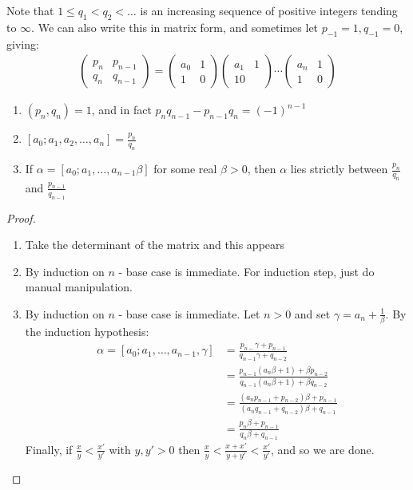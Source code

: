\documentclass[10pt,a4paper]{article}
\begin{document}
Note that $1 \leq q_1 < q_2 < \ldots$ is an increasing sequence of positive integers tending to $\infty$. We can also write this in matrix form, and sometimes let $p_{-1} = 1, q_{-1} = 0$, giving:
\begin{align*}
\begin{pmatrix}
p_n & p_{n-1} \\ q_n & q_{n-1}
\end{pmatrix} = \begin{pmatrix}
a_0 & 1 \\ 1 & 0
\end{pmatrix}\begin{pmatrix}
a_1 & 1 \\ 1  0
\end{pmatrix}\cdots\begin{pmatrix}
a_n & 1 \\ 1 & 0
\end{pmatrix}
\end{align*}
\begin{proposition}
\item
\begin{enumerate}
\item $(p_n, q_n) = 1$, and in fact $p_nq_{n-1} - p_{n-1}q_n = (-1)^{n-1}$
\item $[a_0;a_1, a_2, \ldots, a_n] = \frac{p_n}{q_n}$
\item If $\alpha = [a_0;a_1,\ldots,a_{n-1}\beta]$ for some real $\beta > 0$, then $\alpha$ lies strictly between $\frac{p_n}{q_n}$ and $\frac{p_{n-1}}{q_{n-1}}$
\end{enumerate}
\end{proposition}
\begin{proof}
\item
\begin{enumerate}
\item Take the determinant of the matrix and this appears
\item By induction on $n$ - base case is immediate. For induction step, just do manual manipulation.
\item By induction on $n$ - base case is immediate. Let $n >0$ and set $\gamma = a_n + \frac{1}{\beta}$. By the induction hypothesis:
\begin{align*}
\alpha = [a_0;a_1,\ldots, a_{n-1},\gamma] &= \frac{p_{n-}\gamma + p_{n-1}}{q_{n-1}\gamma + q_{n-2}}\\
&= \frac{p_{n-1}(a_n\beta + 1) + \beta p_{n-2}}{q_{n-1}(a_n \beta + 1) + \beta q_{n-2}}\\
&= \frac{(a_np_{n-1} + p_{n-2})\beta + p_{n-1}}{(a_nq_{n-1} + q_{n-2})\beta + q_{n-1}}\\
&= \frac{p_n \beta + p_{n-1}}{q_n \beta + q_{n-1}}
\end{align*}
Finally, if $\frac{x}{y} < \frac{x'}{y'}$ with $y,y'>0$ then $\frac{x}{y} < \frac{x+x'}{y+y'} < \frac{x'}{y'}$, and so we are done. 
\end{enumerate}
\end{proof}
\end{document}
